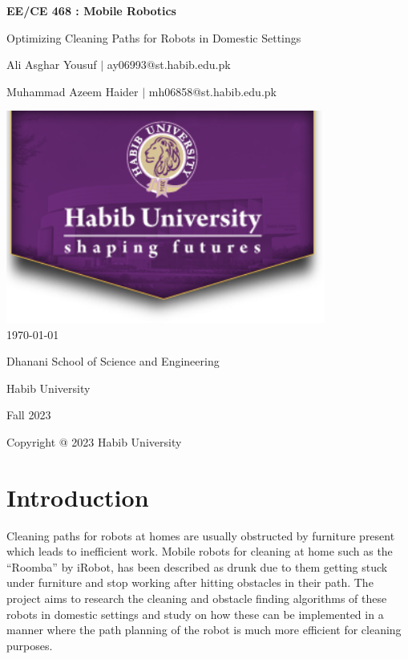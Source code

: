 \documentclass[12pt]{article}
\begin{document}
\begin{titlepage}
    \centering
    {\LARGE\textbf{EE/CE 468 : Mobile Robotics}\par}
    \vspace{0.5cm}
    {\Large Optimizing Cleaning Paths for Robots in Domestic Settings\par}
    \vspace*{\fill} %
    {\large Ali Asghar Yousuf $\mid$ ay06993@st.habib.edu.pk\par}
    {\large Muhammad Azeem Haider $\mid$ mh06858@st.habib.edu.pk\par}
    \vspace{2cm}
    \includegraphics[height=7cm]{../HU_logo}\\\bigskip
    {\large \today}\\\bigskip\bigskip
    \vspace{1cm}
    \vspace{2cm}
    {\large Dhanani School of Science and Engineering\par}
    {\large Habib University\par}
    {\large Fall 2023\par}
    \vspace*{\fill} %
    {\large Copyright @ 2023 Habib University\par}
\end{titlepage}

\thispagestyle{empty} %
\tableofcontents
\clearpage

\section{Introduction}
Cleaning paths for robots at homes are usually obstructed by furniture present
which leads to inefficient work. Mobile robots for cleaning at home such as the
``Roomba'' by iRobot, has been described as drunk due to them getting stuck
under furniture and stop working after hitting obstacles in their path. The
project aims to research the cleaning and obstacle finding algorithms of these
robots in domestic settings and study on how these can be implemented in a
manner where the path planning of the robot is much more efficient for cleaning
purposes.
\end{document}
